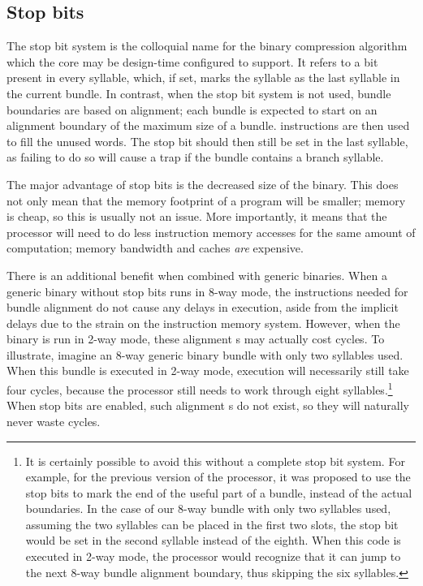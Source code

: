 
\subsection{Stop bits}
\label{sec:core-ug-isa-sbit}

The stop bit system is the colloquial name for the binary compression algorithm
which the core may be design-time configured to support. It refers to a bit
present in every syllable, which, if set, marks the syllable as the last syllable
in the current bundle. In contrast, when the stop bit system is not used, bundle
boundaries are based on alignment; each bundle is expected to start on an
alignment boundary of the maximum size of a bundle.  instructions are
then used to fill the unused words. The stop bit should then still be set in the
last syllable, as failing to do so will cause a trap if the bundle contains a
branch syllable.

The major advantage of stop bits is the decreased size of the binary. This does
not only mean that the memory footprint of a program will be smaller; memory is
cheap, so this is usually not an issue. More importantly, it means that the
processor will need to do less instruction memory accesses for the same amount
of computation; memory bandwidth and caches \emph{are} expensive.

There is an additional benefit when combined with generic binaries. When a
generic binary without stop bits runs in 8-way mode, the  instructions
needed for bundle alignment do not cause any delays in execution, aside from the
implicit delays due to the strain on the instruction memory system. However,
when the binary is run in 2-way mode, these alignment s may actually
cost cycles. To illustrate, imagine an 8-way generic binary bundle with only
two syllables used. When this bundle is executed in 2-way mode, execution will
necessarily still take four cycles, because the processor still needs to work
through eight syllables.\footnote{It is certainly possible to avoid this without
a complete stop bit system. For example, for the previous version of the \rvex{}
processor, it was proposed to use the stop bits to mark the end of the useful
part of a bundle, instead of the actual boundaries. In the case of our 8-way
bundle with only two syllables used, assuming the two syllables can be placed
in the first two slots, the stop bit would be set in the second syllable instead
of the eighth. When this code is executed in 2-way mode, the \rvex{} processor
would recognize that it can jump to the next 8-way bundle alignment boundary,
thus skipping the six  syllables.} When stop bits are enabled, such
alignment s do not exist, so they will naturally never waste cycles.

